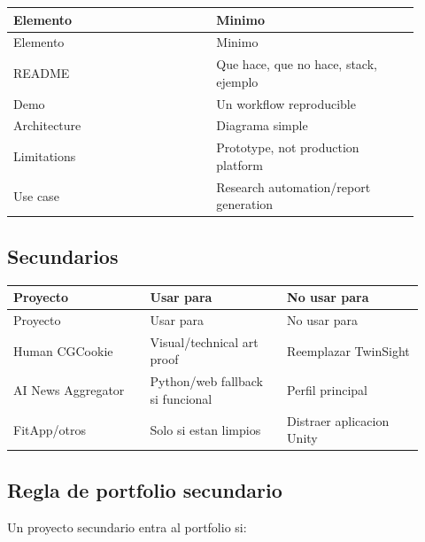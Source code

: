 \begin{center}
\scriptsize
\begin{longtable}{>{\raggedright\arraybackslash}p{0.455\linewidth} >{\raggedright\arraybackslash}p{0.455\linewidth}}
\toprule
Elemento & Minimo \\
\midrule
\endfirsthead
\toprule
Elemento & Minimo \\
\midrule
\endhead
README & Que hace, que no hace, stack, ejemplo \\
Demo & Un workflow reproducible \\
Architecture & Diagrama simple \\
Limitations & Prototype, not production platform \\
Use case & Research automation/report generation \\
\bottomrule
\end{longtable}
\end{center}



\subsection{Secundarios}


\begin{center}
\scriptsize
\begin{longtable}{>{\raggedright\arraybackslash}p{0.305\linewidth} >{\raggedright\arraybackslash}p{0.305\linewidth} >{\raggedright\arraybackslash}p{0.305\linewidth}}
\toprule
Proyecto & Usar para & No usar para \\
\midrule
\endfirsthead
\toprule
Proyecto & Usar para & No usar para \\
\midrule
\endhead
Human CGCookie & Visual/technical art proof & Reemplazar TwinSight \\
AI News Aggregator & Python/web fallback si funcional & Perfil principal \\
FitApp/otros & Solo si estan limpios & Distraer aplicacion Unity \\
\bottomrule
\end{longtable}
\end{center}



\subsection{Regla de portfolio secundario}


Un proyecto secundario entra al portfolio si:


